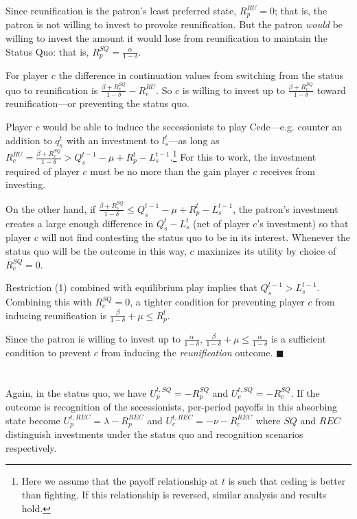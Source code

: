 \documentclass[11pt,letterpaper, notitlepage]{article}
\newcommand{\de}{\delta}
\begin{document}
Since reunification is the patron's least preferred state, $R_p^{RU} =0$; that is, the patron is not willing to invest to provoke reunification. But the patron \textit{would} be willing to invest the amount it would lose from reunification to maintain the Status Quo: that is, $R_p^{SQ} = \frac{\alpha}{1 -\de}$. 

For player $c$ the difference in continuation values from switching from the status quo to reunification is $\frac{\beta + R_c^{SQ}}{1 -\de} -R_c^{RU}$. So $c$ is willing to invest up to $\frac{\beta+ R_c^{SQ}}{1 -\de}$ toward reunification---or preventing the status quo.

Player $c$ would be able to induce the secessionists to play Cede---e.g. counter an addition to $q_s^t$ with an investment to $l_s^t$---as long as $R_c^{RU} = \frac{\beta + R_c^{SQ}}{1 -\de} > Q_s^{t-1} -\mu + R_p^t - L_s^{t-1}$.\footnote{Here we assume that the payoff relationship at $t$ is such that ceding is better than fighting. If this relationship is reversed, similar analysis and results hold.} For this to work, the investment required of player $c$ must be no more than the gain player $c$ receives from investing.

On the other hand, if $\frac{\beta + R_c^{SQ}}{1 -\de} \leq Q_s^{t-1} -\mu + R_p^t - L_s^{t-1}$, the patron's investment creates a large enough difference in $Q_s^t - L_s^t$ (net of player $c$'s investment) so that player $c$ will not find contesting the status quo to be in its interest. Whenever the status quo will be the outcome in this way, $c$ maximizes its utility by choice of $R_c^{SQ} =0$. 

Restriction (1) combined with equilibrium play implies that  $Q_s^{t-1} > L_s^{t-1}$. Combining this with $R_c^{SQ} =0$, a tighter condition for preventing player $c$ from inducing reunification is $\frac{\beta}{1 -\de} + \mu \leq R_p^t$. 

Since the patron is willing to invest up to $\frac{\alpha}{1 -\de}$, $\frac{\beta}{1 -\de} + \mu \leq \frac{\alpha}{1 -\de}$ is a sufficient condition to prevent $c$ from inducing the \emph{reunification} outcome. \hfill $\blacksquare$
\\
\\
 \\
Again, in the status quo, we have $U_p^{t,SQ}= -R_p^{SQ}$ and $U_c^{t,SQ}= -R_c^{SQ}$. If the outcome is recognition of the secessionists, per-period payoffs in this absorbing state become $U_p^{t,REC}= \lambda -R_p^{REC}$ and $U_c^{t,REC}= -\nu -R_c^{REC}$ where $SQ$ and $REC$ distinguish investments under the status quo and recognition scenarios respectively.
\end{document}
